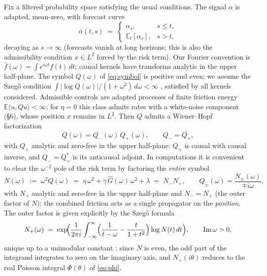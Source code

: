 \documentclass[11pt]{article}
\newcommand{\E}{\mathbb{E}}
\theoremstyle{plain}
\begin{document}
Fix a filtered probability space satisfying the usual conditions. The signal $\alpha$ is adapted, mean-zero, with forecast curve
\[
\bar\alpha(t,s) \;=\; \begin{cases}\alpha_s, & s\le t,\\ \E_t[\alpha_s], & s > t,\end{cases}
\]
decaying as $s\to\infty$ (forecasts vanish at long horizons; this is also the admissibility condition $x\in L^2$ forced by the risk term). Our Fourier convention is $\hat f(\omega)=\int e^{i\omega t}f(t)\,dt$; causal kernels have transforms analytic in the upper half-plane. The symbol $Q(\omega)$ of \eqref{eq:symbol} is positive and even; we assume the Szeg\H{o} condition $\int|\log Q(\omega)|/(1+\omega^2)\,d\omega<\infty$ \citep{Krein1962}, satisfied by all kernels considered. Admissible controls are adapted processes of finite friction energy $\E\langle u, Qu\rangle<\infty$; for $\eta=0$ this class admits rates with a white-noise component (\S6), whose position $x$ remains in $L^2$. Then $Q$ admits a Wiener--Hopf factorization
\begin{equation}\label{eq:wh}
Q(\omega) = Q_-(\omega)\,Q_+(\omega), \qquad Q_- = \overline{Q_+},
\end{equation}
with $Q_+$ analytic and zero-free in the upper half-plane: $Q_+$ is causal with causal inverse, and $Q_- = Q_+^*$ is its anticausal adjoint. In computations it is convenient to clear the $\omega^{-2}$ pole of the risk term by factoring the \emph{entire} symbol
\begin{equation}\label{eq:N}
N(\omega) \;:=\; \omega^2 Q(\omega) \;=\; \eta\,\omega^2 + \gamma\,\hat G(\omega)\,\omega^2 + \lambda \;=\; N_-N_+,
\qquad Q_\pm(\omega) = \frac{N_\pm(\omega)}{\mp i\omega},
\end{equation}
with $N_+$ analytic and zero-free in the upper half-plane and $N_- = \overline{N_+}$ (the outer factor of $N$): the combined friction acts as a single propagator on the \emph{position}. The outer factor is given explicitly by the Szeg\H{o} formula
\begin{equation}\label{eq:szego}
N_+(\omega) \;=\; \exp\!\Bigl(\frac{1}{2\pi i}\int_{-\infty}^{\infty}\Bigl(\frac{1}{t-\omega}-\frac{t}{1+t^2}\Bigr)\log N(t)\,dt\Bigr), \qquad \operatorname{Im}\omega>0,
\end{equation}
unique up to a unimodular constant \citep{Krein1962}; since $N$ is even, the odd part of the integrand integrates to zero on the imaginary axis, and $N_+(i\theta)$ reduces to the real Poisson integral $\Phi(\theta)$ of \eqref{eq:phi}.
\end{document}
